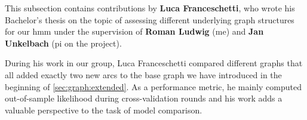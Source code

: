 \begin{tcolorbox}[title=\faIcon{users} Contributions, parbox=false]
    This subsection contains contributions by  \textbf{Luca Franceschetti}, who wrote his Bachelor's thesis \cite{franceschetti_comparison_2022} on the topic of assessing different underlying graph structures for our \gls{hmm} under the supervision of  \textbf{Roman Ludwig} (me) and  \textbf{Jan Unkelbach} (\gls{pi} on the project).

    During his work in our group, Luca Franceschetti compared different graphs that all added exactly two new arcs to the base graph we have introduced in the beginning of \cref{sec:graph:extended}. As a performance metric, he mainly computed out-of-sample likelihood during cross-validation rounds and his work adds a valuable perspective to the task of model comparison.
\end{tcolorbox}
